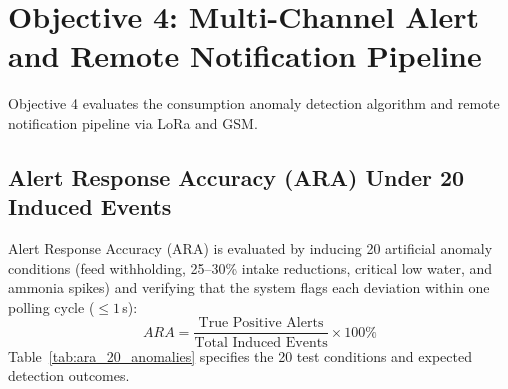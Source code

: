 \section{Objective 4: Multi-Channel Alert and Remote Notification Pipeline}
\label{sec:results_obj4}

Objective 4 evaluates the consumption anomaly detection algorithm and remote notification pipeline via LoRa and GSM.

\subsection{Alert Response Accuracy (ARA) Under 20 Induced Events}
Alert Response Accuracy (ARA) is evaluated by inducing 20 artificial anomaly conditions (feed withholding, 25--30\% intake reductions, critical low water, and ammonia spikes) and verifying that the system flags each deviation within one polling cycle ($\le 1$\,s):
\begin{equation}
ARA = \frac{\text{True Positive Alerts}}{\text{Total Induced Events}} \times 100\%
\end{equation}
Table~\ref{tab:ara_20_anomalies} specifies the 20 test conditions and expected detection outcomes.

